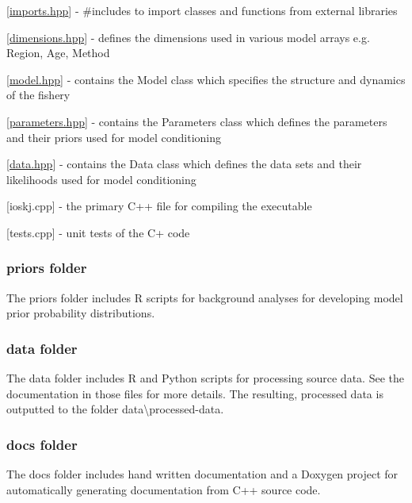 \begin{DoxyItemize}
\item \mbox{[}{\ttfamily \hyperlink{imports_8hpp_source}{imports.\-hpp}}\mbox{]} -\/ {\ttfamily \#include}s to import classes and functions from external libraries
\item \mbox{[}{\ttfamily \hyperlink{dimensions_8hpp_source}{dimensions.\-hpp}}\mbox{]} -\/ defines the dimensions used in various model arrays e.\-g. {\ttfamily Region}, {\ttfamily Age}, {\ttfamily Method}
\item \mbox{[}{\ttfamily \hyperlink{model_8hpp_source}{model.\-hpp}}\mbox{]} -\/ contains the {\ttfamily Model} class which specifies the structure and dynamics of the fishery
\item \mbox{[}{\ttfamily \hyperlink{parameters_8hpp_source}{parameters.\-hpp}}\mbox{]} -\/ contains the {\ttfamily Parameters} class which defines the parameters and their priors used for model conditioning
\item \mbox{[}{\ttfamily \hyperlink{data_8hpp_source}{data.\-hpp}}\mbox{]} -\/ contains the {\ttfamily Data} class which defines the data sets and their likelihoods used for model conditioning
\item \mbox{[}{\ttfamily ioskj.\-cpp}\mbox{]} -\/ the primary C++ file for compiling the executable
\item \mbox{[}{\ttfamily tests.\-cpp}\mbox{]} -\/ unit tests of the C+ code
\end{DoxyItemize}

\subsubsection*{{\ttfamily priors} folder}

The {\ttfamily priors} folder includes R scripts for background analyses for developing model prior probability distributions.

\subsubsection*{{\ttfamily data} folder}

The {\ttfamily data} folder includes R and Python scripts for processing source data. See the documentation in those files for more details. The resulting, processed data is outputted to the folder {\ttfamily data\textbackslash{}processed-\/data}.

\subsubsection*{{\ttfamily docs} folder}

The {\ttfamily docs} folder includes hand written documentation and a Doxygen project for automatically generating documentation from C++ source code. 